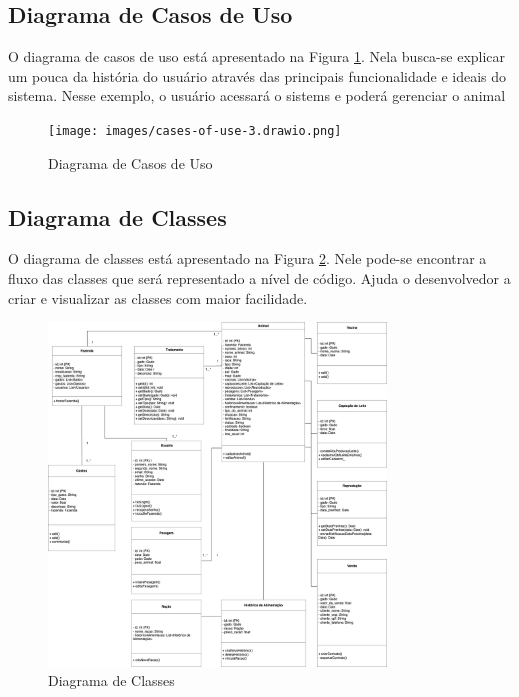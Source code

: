 \documentclass[12pt, a4paper]{article}
\begin{document}
\subsection{Diagrama de Casos de Uso}
\begin{spacing}{1.5}
O diagrama de casos de uso está apresentado na Figura \ref{fig:cases-of-use}. Nela busca-se explicar um pouca da história do usuário através das principais funcionalidade e ideais do sistema. Nesse exemplo, o usuário acessará o sistems e poderá gerenciar o animal 
\begin{figure}[ht]
    \centering
    \texttt{[image: images/cases-of-use-3.drawio.png]}
    \caption{Diagrama de Casos de Uso}
    \label{fig:cases-of-use}
\end{figure}
\end{spacing}

\subsection{Diagrama de Classes}
\begin{spacing}{1.5}
O diagrama de classes está apresentado na Figura \ref{fig:classes-diagram}. Nele pode-se encontrar a fluxo das classes que será representado a nível de código. Ajuda o desenvolvedor a criar e visualizar as classes com maior facilidade.
\begin{figure}[ht]
    \centering
    \includegraphics[width=0.8\textwidth]{images/classesDiagram.drawio.png}
    \caption{Diagrama de Classes}
    \label{fig:classes-diagram}
\end{figure}
\end{spacing}
\end{document}

